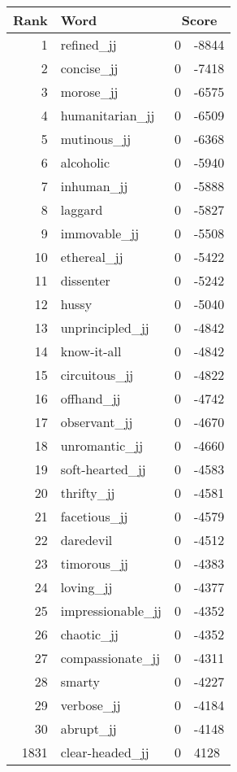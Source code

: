 \begin{longtable}[!htbp]{| rlr@{.}l |}
    \hline
    \textbf{Rank} & \textbf{Word} & \multicolumn{2}{c|}{\textbf{Score}} \\
    \hline
    \endhead
    1 & refined\_jj & 0 & -8844 \\
    2 & concise\_jj & 0 & -7418 \\
    3 & morose\_jj & 0 & -6575 \\
    4 & humanitarian\_jj & 0 & -6509 \\
    5 & mutinous\_jj & 0 & -6368 \\
    6 & alcoholic & 0 & -5940 \\
    7 & inhuman\_jj & 0 & -5888 \\
    8 & laggard & 0 & -5827 \\
    9 & immovable\_jj & 0 & -5508 \\
    10 & ethereal\_jj & 0 & -5422 \\
    11 & dissenter & 0 & -5242 \\
    12 & hussy & 0 & -5040 \\
    13 & unprincipled\_jj & 0 & -4842 \\
    14 & know-it-all & 0 & -4842 \\
    15 & circuitous\_jj & 0 & -4822 \\
    16 & offhand\_jj & 0 & -4742 \\
    17 & observant\_jj & 0 & -4670 \\
    18 & unromantic\_jj & 0 & -4660 \\
    19 & soft-hearted\_jj & 0 & -4583 \\
    20 & thrifty\_jj & 0 & -4581 \\
    21 & facetious\_jj & 0 & -4579 \\
    22 & daredevil & 0 & -4512 \\
    23 & timorous\_jj & 0 & -4383 \\
    24 & loving\_jj & 0 & -4377 \\
    25 & impressionable\_jj & 0 & -4352 \\
    26 & chaotic\_jj & 0 & -4352 \\
    27 & compassionate\_jj & 0 & -4311 \\
    28 & smarty & 0 & -4227 \\
    29 & verbose\_jj & 0 & -4184 \\
    30 & abrupt\_jj & 0 & -4148 \\
    1831 & clear-headed\_jj & 0 & 4128 \\

\end{longtable}
